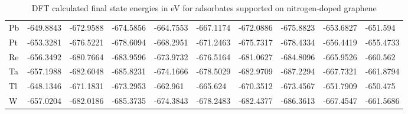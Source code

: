 \begin{table}[h]
{\begin{tabular}{*{10}{l}}
      Pb	& -649.8843	&-672.9588	&-674.5856	&-664.7553	&-667.1174	&-672.0886	&-675.8823	&-653.6827	&-651.594  \\
      Pt	& -653.3281	&-676.5221	&-678.6094	&-668.2951	&-671.2463	&-675.7317	&-678.4334	&-656.4419	&-655.4733 \\
      Re	& -656.3492	&-680.7664	&-683.9596	&-673.9732	&-676.5164	&-681.0627	&-684.8096	&-665.9526	&-660.562  \\
      Ta	& -657.1988	&-682.6048	&-685.8231	&-674.1666	&-678.5029	&-682.9709	&-687.2294	&-667.7321	&-661.8794 \\
      Tl	& -648.1346	&-671.1831	&-673.2953	&-662.961	  &-665.624	  &-670.3512	&-673.4567	&-651.7909	&-650.475  \\
      W	  & -657.0204	&-682.0186	&-685.3735	&-674.3843	&-678.2483	&-682.4377	&-686.3613	&-667.4547	&-661.5686 \\
      \hline
    \end{tabular}
    }
    \caption{DFT calculated final state energies in eV for adsorbates supported on nitrogen-doped graphene}
    \label{si_table5}
\end{table}



